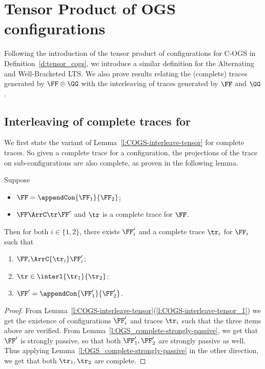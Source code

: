 \section{Tensor Product of OGS configurations}
\label{sec:tensor}

Following the introduction of the tensor product of configurations
for C-OGS in Definition~\ref{d:tensor_cogs}, we 
introduce a similar definition for the Alternating and Well-Bracketed LTS.
We also prove results relating the 
(complete) traces generated by $\FF \otimes \GG$
with the interleaving of traces generated by $\FF$ and $\GG$.


\subsection{Interleaving of complete traces for \COGS}

We first state the variant of Lemma~\ref{l:COGS-interleave-tensor}
for complete traces.
So given a complete trace for a configuration, the projections of the
trace on sub-configurations are also complete, as proven in the following lemma.


\begin{lemma}
  \label{l:COGS-decomp-ct}
  Suppose 
  \begin{itemize}
  \item $\FF = \appendCon{\FF_1}{\FF_2}$;
  \item $\FF \ArrC \tr \FF'$ and $ \tr $ is a complete trace
  for $\FF$.
  \end{itemize} 
  Then for both $i \in \{1,2\}$,
  there exists $\FF_i'$ and a complete trace $\tr_i$
  for $\FF_i$ such that
  \begin{enumerate}
  \item ${\FF_i} \ArrC{\tr_i} \FF_i'$;
  \item $\tr \in \interl{\tr_1}{\tr_2}$;
  \item $\FF' = \appendCon{\FF'_1} {\FF'_2}$.
  \end{enumerate}
\end{lemma}              
  
\begin{proof}
  From Lemma~\ref{l:COGS-interleave-tensor}(\ref{l:COGS-interleave-tensor_1}) 
  we get the existence of configurations $\FF_i'$ and traces $\tr_i$ 
  such that the three items above are verified.
  From Lemma~\ref{l:OGS_complete-strongly-passive}, we get that $\FF'$
  is strongly passive, so that both $\FF'_1,\FF'_2$ are strongly passive as well.
  Thus applying Lemma~\ref{l:OGS_complete-strongly-passive}
  in the other direction,
  we get that both $\tr_1,\tr_2$ are complete.
\end{proof} 

